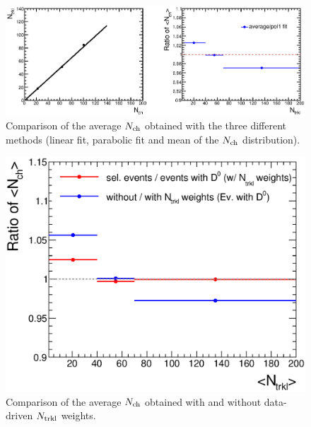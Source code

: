 \begin{figure}[htpb]
\centering
 \includegraphics[width=1\textwidth]{FigCap6/NchSystematics_linFit_WithNtrklsReweight_17f2a.eps}
 \caption{Comparison of the average $N_{\rm ch}$ obtained with the three different methods (linear fit, parabolic fit and mean of the $N_{\rm ch}$ distribution).}
 \label{fig:NchVsCorrHypo}
 \end{figure}


\begin{figure}[htpb]
\centering
 \includegraphics[width=.7\textwidth]{FigCap6/NchSystematics_NtrklWeights_17f2a.eps}
 \caption{Comparison of the average $N_{\rm ch}$ obtained with and without data-driven $N_{\rm trkl}$ weights.}
 \label{fig:NchVsNtrklWithWOweights}
 \end{figure}


